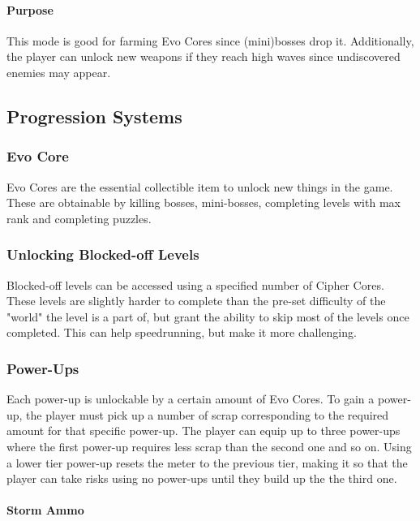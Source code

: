 \documentclass[12pt]{article}
\begin{document}
\paragraph{Purpose}

This mode is good for farming Evo Cores since (mini)bosses drop it. Additionally, the player can unlock new weapons if they reach high waves since undiscovered enemies may appear.

\subsection{Progression Systems}

\subsubsection{Evo Core}

Evo Cores are the essential collectible item to unlock new things in the game. These are obtainable by killing bosses, mini-bosses, completing levels with max rank and completing puzzles. 

\subsubsection{Unlocking Blocked-off Levels}

Blocked-off levels can be accessed using a specified number of Cipher Cores. These levels are slightly harder to complete than the pre-set difficulty of the "world" the level is a part of, but grant the ability to skip most of the levels once completed. This can help speedrunning, but make it more challenging. 

\subsubsection{Power-Ups}

Each power-up is unlockable by a certain amount of Evo Cores. To gain a power-up, the player must pick up a number of scrap corresponding to the required amount for that specific power-up. The player can equip up to three power-ups where the first power-up requires less scrap than the second one and so on. Using a lower tier power-up resets the meter to the previous tier, making it so that the player can take risks using no power-ups until they build up the the third one.

\paragraph{Storm Ammo}
\end{document}
